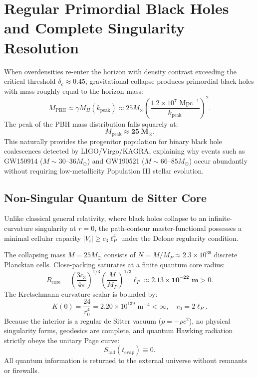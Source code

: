 \documentclass[11pt,a4paper]{article}
\begin{document}
\section{Regular Primordial Black Holes and Complete Singularity Resolution}

When overdensities re-enter the horizon with density contrast exceeding the critical threshold $\delta_c \approx 0.45$, gravitational collapse produces primordial black holes with mass roughly equal to the horizon mass:
\begin{equation}
M_{\mathrm{PBH}} \approx \gamma M_H(k_{\mathrm{peak}}) \approx 25 M_\odot \left( \frac{1.2 \times 10^7\text{ Mpc}^{-1}}{k_{\mathrm{peak}}} \right)^2.
\end{equation}
The peak of the PBH mass distribution falls squarely at:
\begin{equation}
M_{\mathrm{peak}} \approx \mathbf{25\ M_\odot}.
\end{equation}
This naturally provides the progenitor population for binary black hole coalescences detected by LIGO/Virgo/KAGRA, explaining why events such as GW150914 ($M \sim 30\text{--}36 M_\odot$) and GW190521 ($M \sim 66\text{--}85 M_\odot$) occur abundantly without requiring low-metallicity Population III stellar evolution.

\subsection{Non-Singular Quantum de Sitter Core}
Unlike classical general relativity, where black holes collapse to an infinite-curvature singularity at $r=0$, the path-contour master-functional possesses a minimal cellular capacity $|V_i| \ge c_3 \ell_P^4$ under the Delone regularity condition.

The collapsing mass $M = 25 M_\odot$ consists of $N = M / M_P \approx 2.3 \times 10^{39}$ discrete Planckian cells. Close-packing saturates at a finite quantum core radius:
\begin{equation}
R_{\mathrm{core}} = \left( \frac{3 c_3}{4\pi} \right)^{1/3} \left( \frac{M}{M_P} \right)^{1/3} \ell_P \approx \mathbf{2.13 \times 10^{-22}\text{ m}} > 0.
\end{equation}
The Kretschmann curvature scalar is bounded by:
\begin{equation}
K(0) = \frac{24}{r_0^4} = 2.20 \times 10^{139}\text{ m}^{-4} < \infty, \quad r_0 = 2\ell_P.
\end{equation}
Because the interior is a regular de Sitter vacuum ($p = -\rho c^2$), no physical singularity forms, geodesics are complete, and quantum Hawking radiation strictly obeys the unitary Page curve:
\begin{equation}
S_{\mathrm{rad}}(t_{\mathrm{evap}}) \equiv 0.
\end{equation}
All quantum information is returned to the external universe without remnants or firewalls.
\end{document}
